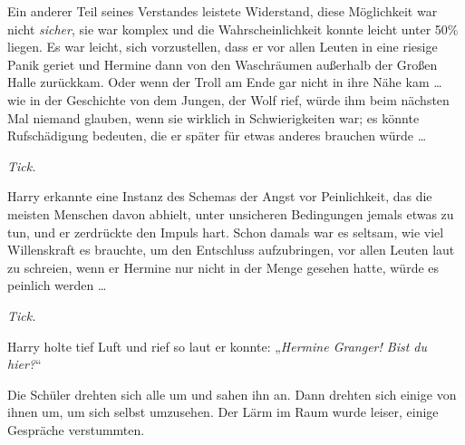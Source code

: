 Ein anderer Teil seines Verstandes leistete Widerstand, diese Möglichkeit war nicht \emph{sicher}, sie war komplex und die Wahrscheinlichkeit konnte leicht unter 50\% liegen. Es war leicht, sich vorzustellen, dass er vor allen Leuten in eine riesige Panik geriet und Hermine dann von den Waschräumen außerhalb der Großen Halle zurückkam. Oder wenn der Troll am Ende gar nicht in ihre Nähe kam … wie in der Geschichte von dem Jungen, der Wolf rief, würde ihm beim nächsten Mal niemand glauben, wenn sie wirklich in Schwierigkeiten war; es könnte Rufschädigung bedeuten, die er später für etwas anderes brauchen würde …

\emph{Tick.}

Harry erkannte eine Instanz des Schemas der Angst vor Peinlichkeit, das die meisten Menschen davon abhielt, unter unsicheren Bedingungen jemals etwas zu tun, und er zerdrückte den Impuls hart. Schon damals war es seltsam, wie viel Willenskraft es brauchte, um den Entschluss aufzubringen, vor allen Leuten laut zu schreien, wenn er Hermine nur nicht in der Menge gesehen hatte, würde es peinlich werden …

\emph{Tick.}

Harry holte tief Luft und rief so laut er konnte:
„\emph{Hermine Granger! Bist du hier?}“

Die Schüler drehten sich alle um und sahen ihn an. Dann drehten sich einige von ihnen um, um sich selbst umzusehen. Der Lärm im Raum wurde leiser, einige Gespräche verstummten.

